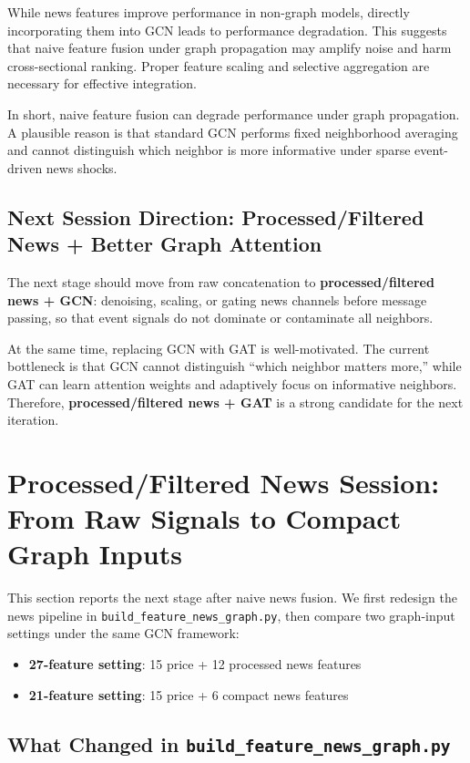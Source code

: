 While news features improve performance in non-graph models, directly incorporating them into GCN leads to performance degradation. This suggests that naive feature fusion under graph propagation may amplify noise and harm cross-sectional ranking. Proper feature scaling and selective aggregation are necessary for effective integration.

In short, naive feature fusion can degrade performance under graph propagation. A plausible reason is that standard GCN performs fixed neighborhood averaging and cannot distinguish which neighbor is more informative under sparse event-driven news shocks.

\subsection{Next Session Direction: Processed/Filtered News + Better Graph Attention}

The next stage should move from raw concatenation to \textbf{processed/filtered news + GCN}: denoising, scaling, or gating news channels before message passing, so that event signals do not dominate or contaminate all neighbors.

At the same time, replacing GCN with GAT is well-motivated. The current bottleneck is that GCN cannot distinguish ``which neighbor matters more,'' while GAT can learn attention weights and adaptively focus on informative neighbors. Therefore, \textbf{processed/filtered news + GAT} is a strong candidate for the next iteration.

\section{Processed/Filtered News Session: From Raw Signals to Compact Graph Inputs}

This section reports the next stage after naive news fusion. We first redesign the news pipeline in \texttt{build\_feature\_news\_graph.py}, then compare two graph-input settings under the same GCN framework:
\begin{itemize}
\item \textbf{27-feature setting}: 15 price + 12 processed news features
\item \textbf{21-feature setting}: 15 price + 6 compact news features
\end{itemize}

\subsection{What Changed in \texttt{build\_feature\_news\_graph.py}}

